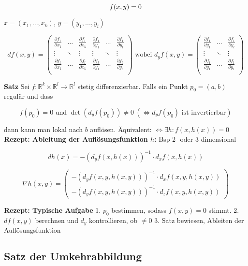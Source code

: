 \[
    f(x, y) = 0\\
\]

$x = (x_1, ..., x_k)$, $y = (y_1, ..., y_l)$

\[
    df(x, y) =
        \begin{pmatrix}
            \frac{\partial f_1}{\partial x_1} & \hdots & \frac{\partial f_1}{\partial x_k}
            & \frac{\partial f_1}{\partial y_1} & \hdots & \frac{\partial f_1}{\partial y_l}\\
            
            \vdots & \ddots & \vdots & \vdots & \ddots & \vdots\\
            
            \frac{\partial f_l}{\partial x_1} & \hdots & \frac{\partial f_l}{\partial x_k}
            & \frac{\partial f_l}{\partial y_1} & \hdots & \frac{\partial f_l}{\partial y_l}\\
        \end{pmatrix} \text{ wobei }
    d_yf(x, y) =
        \begin{pmatrix}
            \frac{\partial f_1}{\partial y_1} & \hdots & \frac{\partial f_1}{\partial y_l}\\
            
            \vdots & \ddots & \vdots\\
            
            \frac{\partial f_l}{\partial y_1} & \hdots & \frac{\partial f_l}{\partial y_l}\\
        \end{pmatrix}
\]

\textbf{Satz} Sei $f: \mathbb{R}^k \times \mathbb{R}^l \to \mathbb{R}^l$ stetig differenzierbar. Falls ein Punkt $p_0 = (a, b)$ regulär und dass

\[
    f(p_0) = 0 \text{ und } \det(d_y f(p_0)) \neq 0\ (\iff d_y f(p_0) \text{ ist invertierbar})
\]

dann kann man lokal nach $b$ auflösen. Äquivalent: $\iff \exists h: f(x, h(x)) = 0$\\

\textbf{Rezept: Ableitung der Auflösungsfunktion $h$:} Bsp 2- oder 3-dimensional

\[
    dh(x) = -(d_y f(x, h(x)))^{-1} \cdot d_x f(x, h(x))
\]


\[
    \nabla h(x, y) =
        \begin{pmatrix}
            -(d_y f(x, y, h(x, y)))^{-1} \cdot d_x f(x, y, h(x, y))\\
            -(d_y f(x, y, h(x, y)))^{-1} \cdot d_z f(x, y, h(x, y))
        \end{pmatrix}
\]

\textbf{Rezept: Typische Aufgabe} 1. $p_0$ bestimmen, sodass $f(x, y)=0$ stimmt. 2. $df(x, y)$ berechnen und $d_y$ kontrollieren, ob $\neq 0$ 3. Satz bewiesen, Ableiten der Auflösungsfunktion

\subsection{Satz der Umkehrabbildung}

